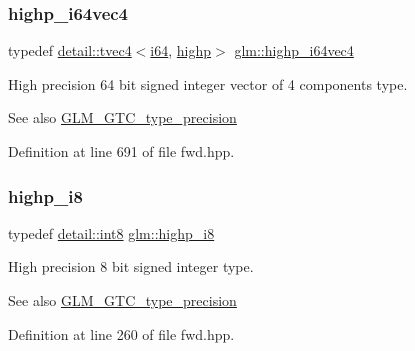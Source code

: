 \subsubsection{\texorpdfstring{highp\+\_\+i64vec4}{highp\_i64vec4}}
{\footnotesize\ttfamily typedef \hyperlink{structglm_1_1detail_1_1tvec4}{detail\+::tvec4}$<$\hyperlink{group__gtc__type__precision_gac7a7eaad46064fc952b06df33689da23}{i64}, \hyperlink{namespaceglm_a0f04f086094c747d227af4425893f545ac6f7eab42eacbb10d59a58e95e362074}{highp}$>$ \hyperlink{group__gtc__type__precision_ga0ea279cd954fbb71a1db62e897d4d7f5}{glm\+::highp\+\_\+i64vec4}}

High precision 64 bit signed integer vector of 4 components type. \begin{DoxySeeAlso}{See also}
\hyperlink{group__gtc__type__precision}{G\+L\+M\+\_\+\+G\+T\+C\+\_\+type\+\_\+precision} 
\end{DoxySeeAlso}


Definition at line 691 of file fwd.\+hpp.

\mbox{\label{group__gtc__type__precision_ga8b9eb0b24cce7f14478bfcacb53ce839}} 
\subsubsection{\texorpdfstring{highp\+\_\+i8}{highp\_i8}}
{\footnotesize\ttfamily typedef \hyperlink{namespaceglm_1_1detail_a04b526a8d7a9b455602a0afa78c531e0}{detail\+::int8} \hyperlink{group__gtc__type__precision_ga8b9eb0b24cce7f14478bfcacb53ce839}{glm\+::highp\+\_\+i8}}

High precision 8 bit signed integer type. \begin{DoxySeeAlso}{See also}
\hyperlink{group__gtc__type__precision}{G\+L\+M\+\_\+\+G\+T\+C\+\_\+type\+\_\+precision} 
\end{DoxySeeAlso}


Definition at line 260 of file fwd.\+hpp.

\mbox{\label{group__gtc__type__precision_ga0334353753f93388bcc89f91c9aff476}} 

